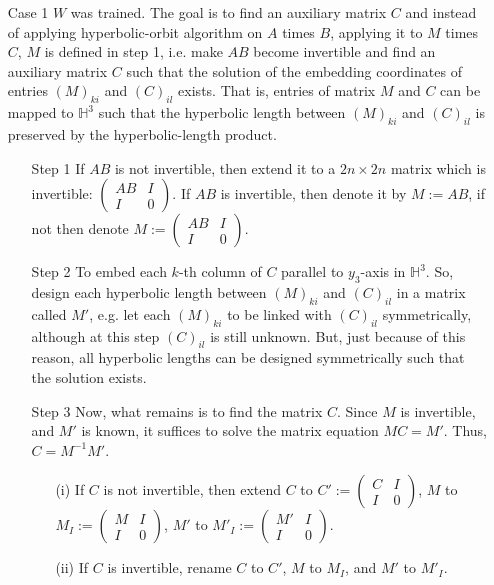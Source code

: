 \documentclass{article}
\theoremstyle{plain}
\theoremstyle{plain} %
\theoremstyle{definition}  %
\theoremstyle{remark}  %
\theoremstyle{plain}
\begin{document}
\begin{itemize}
\item[Case 1]$W$ was trained. 
The goal is to find an auxiliary matrix $C$ and instead of applying hyperbolic-orbit algorithm on $A$ times $B$, applying it to $M$ times $C$, $M$ is defined in step 1, i.e. make $AB$ become invertible and find an auxiliary matrix $C$ such that the solution of the embedding coordinates of entries $(M)_{ki}$ and $(C)_{il}$ exists. That is, entries of matrix $M$ and $C$ can be mapped to $\mathbb{H}^3$ such that the hyperbolic length between $(M)_{ki}$ and $(C)_{il}$ is preserved by the hyperbolic-length product. 
\begin{itemize}
\item[Step 1] If $AB$ is not invertible, then extend it to a $2n\times 2n$ matrix which is invertible:
$\begin{pmatrix}
 AB & I\\
 I & 0
\end{pmatrix}$. If $AB$ is invertible, then denote it by $M:=AB$, if not then denote $M:=\begin{pmatrix}
 AB & I\\
 I & 0
\end{pmatrix}.$
\item[Step 2] 
To embed each $k$-th column of $C$ parallel to $y_3$-axis in $\mathbb{H}^3$. So, design each hyperbolic length between $(M)_{ki}$ and $(C)_{il}$ in a matrix called $M'$, e.g. let each $(M)_{ki}$ to be linked with $(C)_{il}$ symmetrically, although at this step $(C)_{il}$ is still unknown. But, just because of this reason, all hyperbolic lengths can be designed symmetrically such that the solution exists.

\item[Step 3] Now, what remains is to find the matrix $C$. Since $M$ is invertible, and $M'$ is known, it suffices to solve the matrix equation $MC=M'$. Thus, $C=M^{-1}M'$. 
\begin{itemize}
\item[(i)] If $C$ is not invertible, then extend $C$ to $C':=\begin{pmatrix}
 C & I\\
 I & 0
\end{pmatrix}$, $M$ to $M_I:=\begin{pmatrix}
 M & I\\
 I & 0
\end{pmatrix}$, $M'$ to $M'_I:=\begin{pmatrix}
 M' & I\\
 I & 0
\end{pmatrix}$.
\item[(ii)] If $C$ is invertible, rename $C$ to $C'$, $M$ to $M_I$, and $M'$ to $M'_I$.
\end{itemize}



\end{itemize}
\end{itemize}
\end{document}
